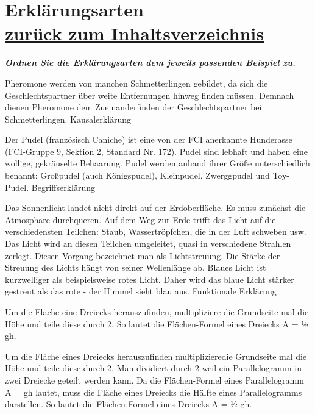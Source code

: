 \documentclass[a4paper]{article}
\newenvironment{question}[2]{%
    \section[#1 \normalfont(#2)]{#1\\\small\normalfont\hyperlink{tableofcontents}{zurück zum Inhaltsverzeichnis}}%
}{%
    \newpage%
}
\newcommand{\assignment}[1]{\textbf{\textit{#1}}\newline}
\newenvironment{mapping}[1]{%
    \begin{question}{#1}{Zuordnungsaufgabe}%
    \newcommand{\ismappedto}{\tcblower}%
    \newenvironment{answer}{\begin{mapping-box}}{\end{mapping-box}}%
}{%
    \end{question}%
}
\begin{document}
\begin{mapping}{Erklärungsarten}
    \assignment{Ordnen Sie die Erklärungsarten dem jeweils passenden Beispiel zu.}
    \begin{answer}
        Pheromone werden von manchen Schmetterlingen gebildet, da sich die Geschlechtspartner über weite Entfernungen hinweg finden müssen. Demnach dienen Pheromone dem Zueinanderfinden der Geschlechtspartner bei Schmetterlingen.
        \ismappedto
        Kausalerklärung
    \end{answer}
    \begin{answer}
        Der Pudel (französisch Caniche) ist eine von der FCI anerkannte Hunderasse (FCI-Gruppe 9, Sektion 2, Standard Nr. 172). Pudel sind lebhaft und haben eine wollige, gekräuselte Behaarung. Pudel werden anhand ihrer Größe unterschiedlich benannt: Großpudel (auch Königspudel), Kleinpudel, Zwerggpudel und Toy-Pudel.
        \ismappedto
        Begriffserklärung
    \end{answer}
    \begin{answer}
        Das Sonnenlicht landet nicht direkt auf der Erdoberfläche. Es muss zunächst die Atmosphäre durchqueren. Auf dem Weg zur Erde trifft das Licht auf die verschiedensten Teilchen: Staub, Wassertröpfchen, die in der Luft schweben usw. Das Licht wird an diesen Teilchen umgeleitet, quasi in verschiedene Strahlen zerlegt. Diesen Vorgang bezeichnet man als Lichtstreuung. Die Stärke der Streuung des Lichts hängt von seiner Wellenlänge ab. Blaues Licht ist kurzwelliger als beispielsweise rotes Licht. Daher wird das blaue Licht stärker gestreut als das rote - der Himmel sieht blau aus.
        \ismappedto
        Funktionale Erklärung
    \end{answer}
    \begin{answer}
        Um die Fläche eine Dreiecks herauszufinden, multipliziere die Grundseite mal die Höhe und teile diese durch 2. So lautet die Flächen-Formel eines Dreiecks A = ½ gh.
    \end{answer}
    \begin{answer}
        Um die Fläche eines Dreiecks herauszufinden multiplizieredie Grundseite mal die Höhe und teile diese durch 2. Man dividiert durch 2 weil ein Parallelogramm in zwei Dreiecke geteilt werden kann. Da die Flächen-Formel eines Parallelogramm A = gh lautet, muss die Fläche eines Dreiecks die Hälfte eines Parallelogramms darstellen. So lautet die Flächen-Formel eines Dreiecks A = ½ gh.
    \end{answer}
\end{mapping}
\end{document}
